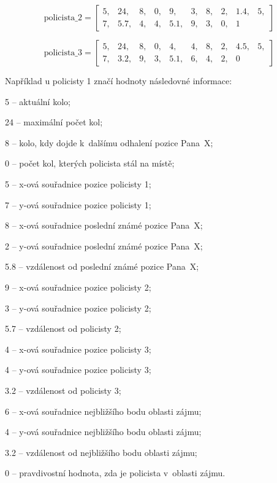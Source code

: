 \[
\text{policista\_2} = \begin{bmatrix}
5, & 24, & 8, & 0, & 9, & 3, & 8, & 2, & 1.4, & 5, \\
7, & 5.7, & 4, & 4, & 5.1, & 9, & 3, & 0, & 1
\end{bmatrix}
\]

\[
\text{policista\_3} = \begin{bmatrix}
5, & 24, & 8, & 0, & 4, & 4, & 8, & 2, & 4.5, & 5, \\
7, & 3.2, & 9, & 3, & 5.1, & 6, & 4, & 2, & 0
\end{bmatrix}
\]

\pagebreak

Například u policisty 1 značí hodnoty následovné informace:
\begin{myitemize}
  \item 5 -- aktuální kolo;
  \item 24 -- maximální počet kol;
  \item 8 -- kolo, kdy dojde k~dalšímu odhalení pozice Pana~X;
  \item 0 -- počet kol, kterých policista stál na místě;
  \item 5 -- x-ová souřadnice pozice policisty 1;
  \item 7 -- y-ová souřadnice pozice policisty 1;
  \item 8 -- x-ová souřadnice poslední známé pozice Pana~X;
  \item 2 -- y-ová souřadnice poslední známé pozice Pana~X;
  \item 5.8 -- vzdálenost od poslední známé pozice Pana~X;
  \item 9 -- x-ová souřadnice pozice policisty 2;
  \item 3 -- y-ová souřadnice pozice policisty 2;
  \item 5.7 -- vzdálenost od policisty 2;
  \item 4 -- x-ová souřadnice pozice policisty 3;
  \item 4 -- y-ová souřadnice pozice policisty 3;
  \item 3.2 -- vzdálenost od policisty 3;
  \item 6 -- x-ová souřadnice nejbližšího bodu oblasti zájmu;
  \item 4 -- y-ová souřadnice nejbližšího bodu oblasti zájmu;
  \item 3.2 -- vzdálenost od nejbližšího bodu oblasti zájmu;
  \item 0 -- pravdivostní hodnota, zda je policista v~oblasti zájmu.
\end{myitemize}

